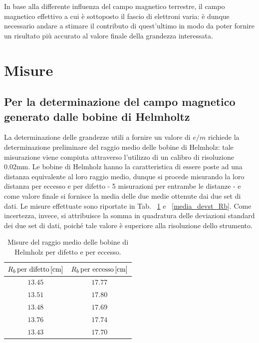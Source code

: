 \documentclass[]{article}
\let\oldsection\section%
\renewcommand{\section}{%
	\renewcommand{\theequation}{\thesection.\arabic{equation}}%
	\oldsection}%
\let\oldsubsection\subsection%
\renewcommand{\subsection}{%
	\renewcommand{\theequation}{\thesubsection.\arabic{equation}}%
	\oldsubsection}%
\begin{document}
    In base alla differente influenza del campo magnetico terrestre, il campo magnetico effettivo a cui è sottoposto il fascio di elettroni varia: è dunque necessario andare a stimare il contributo di quest'ultimo in modo da poter fornire un risultato più accurato al valore finale della grandezza interessata.

    \section{Misure}

    \subsection{Per la determinazione del campo magnetico generato dalle bobine di Helmholtz}

    La determinazione delle grandezze utili a fornire un valore di $e/m$ richiede la determinazione preliminare del raggio medio delle bobine di Helmholz: tale misurazione viene compiuta attraverso l'utilizzo di un calibro di risoluzione $0.02 \text{mm}$. Le bobine di Helmholz hanno la caratteristica di essere poste ad una distanza equivalente al loro raggio medio, dunque si procede misurando la loro distanza per eccesso e per difetto - 5 misurazioni per entrambe le distanze - e come valore finale si fornisce la media delle due medie ottenute dai due set di dati. Le misure effettuate sono riportate in Tab. ~\ref{Raggio_bobine} e ~\ref{media_devst_Rb}. Come incertezza, invece, si attribuisce la somma in quadratura delle deviazioni standard dei due set di dati, poiché tale valore è superiore alla risoluzione dello strumento.


    \begin{table}[H]
        \centering
    
        \begin{tabular}{||c|c||}
            \hline
            $R_b \, \text{per difetto\,} \text{[cm]} $ & $R_b \, \text{per eccesso\,} \text{[cm]} $\\
            \hline\hline
    
            $ 13.45 $ & $ 17.77 $ \\\hline
            $ 13.51 $ & $ 17.80 $ \\\hline
            $ 13.48 $ & $ 17.69 $ \\\hline
            $ 13.76 $ & $ 17.74 $ \\\hline
            $ 13.43 $ & $ 17.70 $ \\\hline
        
        \end{tabular}
        \caption{Misure del raggio medio delle bobine di Helmholz per difetto e per eccesso.}
        \label{Raggio_bobine}
    \end{table}
    
\end{document}
